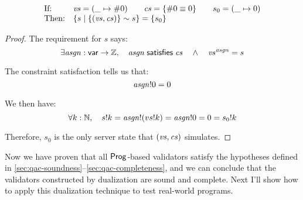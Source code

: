\begin{lemma}[\ref{eq:rc3}]
\[\begin{array}{ll}
\text{If:}&
\mathit{vs}=(\_\mapsto\#0)\qquad
\mathit{cs}=\{\#0\equiv0\}\qquad
s_0=(\_\mapsto0)\\
\text{Then:}&\{s\mid\{(\mathit{vs},\mathit{cs})\}\sim s\}=\{s_0\}
\end{array}\]
\begin{proof}
The requirement for $s$ says:
\[\exists \mathit{asgn}:\mathsf{var}\to\mathbb Z,\quad\mathit{asgn}\;\mathsf{satisfies}\;\mathit{cs}\quad\wedge\quad \mathit{vs}^{\mathit{asgn}}=s\]

The constraint satisfaction tells us that:
\[\mathit{asgn}!0=0\]

We then have:
\[\forall k:\mathbb N,\quad s!k=\mathit{asgn}!(vs!k)=\mathit{asgn}!0=0=s_0!k\]

Therefore, $s_0$ is the only server state that $(\mathit{vs},\mathit{cs})$ simulates.
\end{proof}
\end{lemma}

Now we have proven that all $\mathsf{Prog}$-based validators satisfy the hypotheses
defined in \autoref{sec:qac-soundness}--\ref{sec:qac-completeness}, and we can
conclude that the validators constructed by dualization are sound and complete.
Next I'll show how to apply this dualization technique to test real-world
programs.
